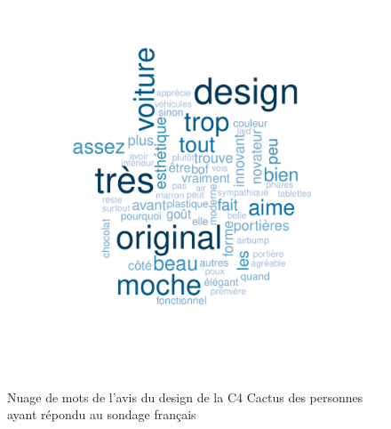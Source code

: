 \documentclass[12pt]{article}\usepackage[]{graphicx}\usepackage[]{color}
\makeatletter
\def\maxwidth{ %
  \ifdim\Gin@nat@width>\linewidth
    \linewidth
  \else
    \Gin@nat@width
  \fi
}
\newenvironment{knitrout}{}{} %
\makeatother
\begin{document}
\begin{knitrout}
\color{fgcolor}\begin{figure}[H]
\includegraphics[width=\maxwidth]{figure/design_fr-1} \caption[Nuage de mots de l'avis du design de la C4 Cactus des personnes ayant répondu au sondage français]{Nuage de mots de l'avis du design de la C4 Cactus des personnes ayant répondu au sondage français}\label{fig:design fr}
\end{figure}


\end{knitrout}
\end{document}
